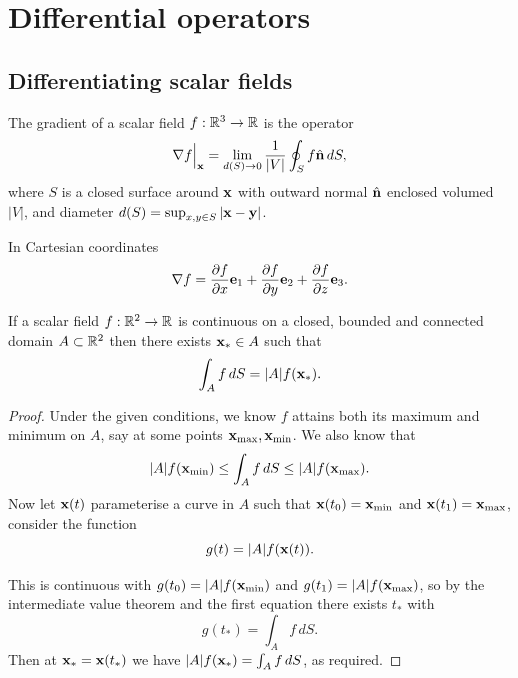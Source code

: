 \documentclass[10pt, a4paper]{article}
\begin{document}
\newpage

\section{Differential operators}

\subsection{Differentiating scalar fields}

\begin{definition}
    The gradient of a scalar field $f : \R ^ 3 \to \R$ is the operator
    \[
    \nabla f\Bigr\rvert_{\mbf{x}} = \lim_{d(S) \to 0}\frac{1}{|V|}\oint_{S}f\hat{\mbf{n}}\,dS,
    \]
    where $S$ is a closed surface around $\mbf{x}$ with outward normal $\hat{\mbf{n}}$ enclosed volumed $|V|$,
    and diameter $d(S) = \sup_{x, y \in S}|\mbf{x} - \mbf{y}|$.
\end{definition}

\begin{proposition}
    In Cartesian coordinates
    \[
    \mbf{\nabla}f = \pd[f]{x}\mbf{e}_1 + \pd[f]{y}\mbf{e}_2 + \pd[f]{z}\mbf{e}_3.
    \]
\end{proposition}

\begin{lemma}
    If a scalar field $f : \R ^ 2 \to \R$ is continuous on a closed,
    bounded and connected domain $A \subset \R ^ 2$ then there exists $\mbf{x}_{*} \in A$ such that
    \[
    \int_{A}f\,dS = |A|f(\mbf{x}_{*}).
    \]

    \begin{proof}
        Under the given conditions,
        we know $f$ attains both its maximum and minimum on $A$,
        say at some points $\mbf{x}_{\text{max}}, \mbf{x}_{\text{min}}$.
        We also know that
        \[
        |A|f(\mbf{x}_{\text{min}}) \leq \int_{A}f\,dS \leq |A|f(\mbf{x}_{\text{max}}).
        \]
        Now let $\mbf{x}(t)$ parameterise a curve in $A$ such that $\mbf{x}(t_0) = \mbf{x}_{\text{min}}$ and $\mbf{x}(t_1) = \mbf{x}_{\text{max}}$,
        consider the function
        \[
        g(t) = |A|f(\mbf{x}(t)).
        \]

        This is continuous with $g(t_0) = |A|f(\mbf{x}_{\text{min}})$ and $g(t_1) = |A|f(\mbf{x}_{\text{max}})$,
        so by the intermediate value theorem and the first equation there exists $t_{*}$ with
        \[
        g(t_{*}) = \int_{A}f\,dS.
        \]
        Then at $\mbf{x}_{*} = \mbf{x}(t_{*})$ we have $|A|f(\mbf{x}_{*}) = \int_{A}f\,dS$,
        as required.
    \end{proof}
\end{lemma}
\end{document}

